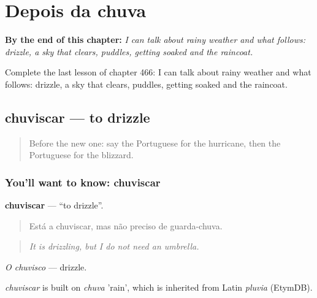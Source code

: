 
\chapter{Depois da chuva}
\label{ch:pt-depois-da-chuva}

\begin{chapteropening}
\textbf{By the end of this chapter:} \emph{I can talk about rainy weather and what follows: drizzle, a sky that clears, puddles, getting soaked and the raincoat.}

Complete the last lesson of chapter 466: I can talk about rainy weather and what follows: drizzle, a sky that clears, puddles, getting soaked and the raincoat.
\end{chapteropening}

\section[chuviscar]{chuviscar — to drizzle}

\label{lesson:PT-C466-chuviscar}



\begin{quote}
Before the new one: say the Portuguese for the hurricane, then the Portuguese for the blizzard.
\end{quote}

\subsection*{You'll want to know: chuviscar}
\textbf{chuviscar} — \textquotedblleft{}to drizzle\textquotedblright{}.

\begin{quote}
Está a chuviscar, mas não preciso de guarda-chuva.
\end{quote}

\begin{quote}
\emph{It is drizzling, but I do not need an umbrella.}
\end{quote}

\emph{O chuvisco} — drizzle.

\begin{cousinweb}
\emph{chuviscar} is built on \emph{chuva} 'rain', which is inherited from Latin \emph{pluvia} (EtymDB).
\end{cousinweb}


